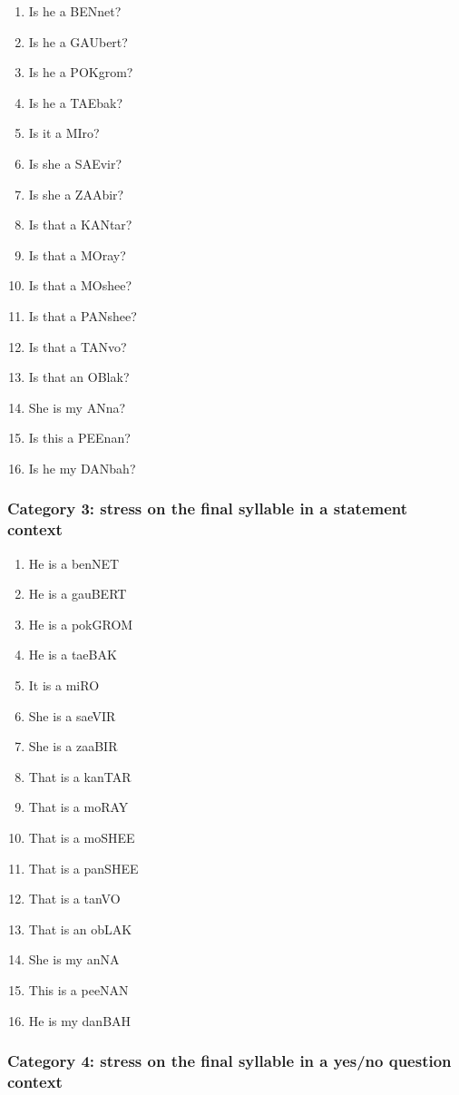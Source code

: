 \documentclass[a4paper]{article}
\begin{document}
\begin{enumerate}
\item Is he a BENnet?
\item Is he a GAUbert?
\item Is he a POKgrom?
\item Is he a TAEbak?
\item Is it a MIro?
\item Is she a SAEvir?
\item Is she a ZAAbir?
\item Is that a KANtar?
\item Is that a MOray?
\item Is that a MOshee?
\item Is that a PANshee?
\item Is that a TANvo?
\item Is that an OBlak?
\item She is my ANna?
\item Is this a PEEnan?
\item Is he my DANbah?
\end{enumerate}

\subsubsection{Category 3: stress on the final syllable in a statement context}

\begin{enumerate}
\item He is a benNET
\item He is a gauBERT
\item He is a pokGROM
\item He is a taeBAK
\item It is a miRO
\item She is a saeVIR
\item She is a zaaBIR
\item That is a kanTAR
\item That is a moRAY
\item That is a moSHEE
\item That is a panSHEE
\item That is a tanVO
\item That is an obLAK
\item She is my anNA
\item This is a peeNAN
\item He is my danBAH
\end{enumerate}

\subsubsection{Category 4: stress on the final syllable in a yes/no question context}
\end{document}
